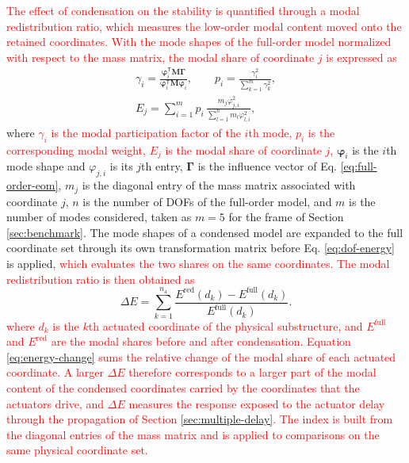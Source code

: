 \documentclass[11pt,a4paper]{article}
\numberwithin{equation}{section}
\newcommand{\rev}[1]{\textcolor{red}{#1}}
\begin{document}
\rev{The effect of condensation on the stability is quantified through a modal redistribution ratio, which measures the low-order modal content moved onto the retained coordinates. With the mode shapes of the full-order model normalized with respect to the mass matrix, the modal share of coordinate \(j\) is expressed as}
\begin{equation}
	\begin{gathered}
		\gamma_{i}=
		\frac{\bm{\varphi}_{i}^{\mathsf{T}}\mathbf{M}\bm{\Gamma}}
		{\bm{\varphi}_{i}^{\mathsf{T}}\mathbf{M}\bm{\varphi}_{i}},
		\qquad
		p_{i}=\frac{\gamma_{i}^{2}}{\displaystyle\sum_{k=1}^{m}\gamma_{k}^{2}},\\[2pt]
		E_{j}=\sum_{i=1}^{m}p_{i}\,
		\frac{m_{j}\varphi_{j,i}^{2}}{\displaystyle\sum_{l=1}^{n}m_{l}\varphi_{l,i}^{2}},
	\end{gathered}
	\label{eq:dof-energy}
\end{equation}
where \rev{\(\gamma_{i}\) is the modal participation factor of the \(i\)th mode, \(p_{i}\) is the corresponding modal weight, \(E_{j}\) is the modal share of coordinate \(j\),} \(\bm{\varphi}_{i}\) is the \(i\)th mode shape and \(\varphi_{j,i}\) is its \(j\)th entry, \(\bm{\Gamma}\) is the influence vector of Eq. \eqref{eq:full-order-eom}, \(m_{j}\) is the diagonal entry of the mass matrix associated with coordinate \(j\), \(n\) is the number of DOFs of the full-order model, and \(m\) is the number of modes considered, taken as \(m=5\) for the frame of Section \ref{sec:benchmark}. The mode shapes of a condensed model are expanded to the full coordinate set through its own transformation matrix before Eq. \eqref{eq:dof-energy} is applied, \rev{which evaluates the two shares on the same coordinates. The modal redistribution ratio is then obtained as}
\begin{equation}
	\Delta E=\sum_{k=1}^{n_{\mathrm{a}}}
	\frac{E^{\mathrm{red}}(d_{k})-E^{\mathrm{full}}(d_{k})}{E^{\mathrm{full}}(d_{k})}.
	\label{eq:energy-change}
\end{equation}
\rev{where \(d_{k}\) is the \(k\)th actuated coordinate of the physical substructure, and \(E^{\mathrm{full}}\) and \(E^{\mathrm{red}}\) are the modal shares before and after condensation. Equation \eqref{eq:energy-change} sums the relative change of the modal share of each actuated coordinate. A larger \(\Delta E\) therefore corresponds to a larger part of the modal content of the condensed coordinates carried by the coordinates that the actuators drive, and \(\Delta E\) measures the response exposed to the actuator delay through the propagation of Section \ref{sec:multiple-delay}. The index is built from the diagonal entries of the mass matrix and is applied to comparisons on the same physical coordinate set.}
\end{document}
